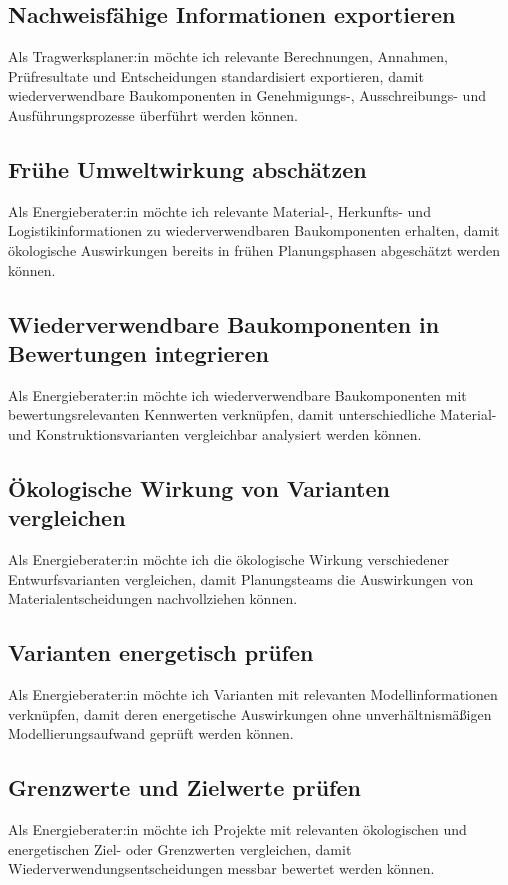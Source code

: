 \subsection{Nachweisfähige Informationen exportieren}
\label{us:t-06} Als Tragwerksplaner:in möchte ich relevante Berechnungen, Annahmen, Prüfresultate und Entscheidungen standardisiert exportieren, damit wiederverwendbare Baukomponenten in Genehmigungs-, Ausschreibungs- und Ausführungsprozesse überführt werden können.


\subsection{Frühe Umweltwirkung abschätzen}
\label{us:e-01} Als Energieberater:in möchte ich relevante Material-, Herkunfts- und Logistikinformationen zu wiederverwendbaren Baukomponenten erhalten, damit ökologische Auswirkungen bereits in frühen Planungsphasen abgeschätzt werden können.

\subsection{Wiederverwendbare Baukomponenten in Bewertungen integrieren}
\label{us:e-02} Als Energieberater:in möchte ich wiederverwendbare Baukomponenten mit bewertungsrelevanten Kennwerten verknüpfen, damit unterschiedliche Material- und Konstruktionsvarianten vergleichbar analysiert werden können.

\subsection{Ökologische Wirkung von Varianten vergleichen}
\label{us:e-03} Als Energieberater:in möchte ich die ökologische Wirkung verschiedener Entwurfsvarianten vergleichen, damit Planungsteams die Auswirkungen von Materialentscheidungen nachvollziehen können.

\subsection{Varianten energetisch prüfen}
\label{us:e-04} Als Energieberater:in möchte ich Varianten mit relevanten Modellinformationen verknüpfen, damit deren energetische Auswirkungen ohne unverhältnismäßigen Modellierungsaufwand geprüft werden können.

\subsection{Grenzwerte und Zielwerte prüfen}
\label{us:e-05} Als Energieberater:in möchte ich Projekte mit relevanten ökologischen und energetischen Ziel- oder Grenzwerten vergleichen, damit Wiederverwendungsentscheidungen messbar bewertet werden können.

